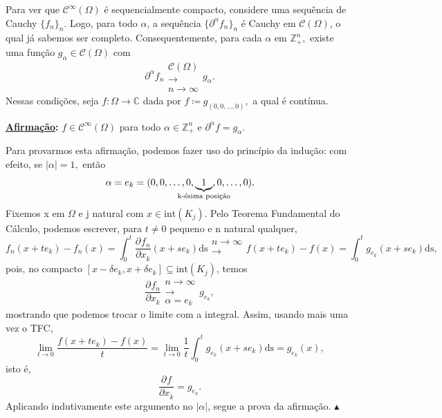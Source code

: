 \documentclass[../distribution_theory_notes.tex]{subfiles}
\begin{document}
\begin{example}
	Para ver que \(\mathcal{C}^{\infty}(\Omega )\) é sequencialmente compacto, considere uma sequência de Cauchy \(\{f_{n}\}_{n}\). Logo, para todo \(\alpha \), a sequência \(\{\partial^{\alpha }f_{n}\}_{n}\) é Cauchy em \(\mathcal{C}(\Omega )\), o qual já sabemos ser completo. Consequentemente, para cada \(\alpha \) em  \(\mathbb{Z}_{+}^{n},\) existe uma função \(g_{\alpha }\in \mathcal{C}(\Omega )\) com
	\[
		\partial^{\alpha }f_{n}\substack{\mathcal{C}(\Omega ) \\ \rightarrow \\ n\to \infty}g_{\alpha }.
	\]
	Nessas condições, seja \(f:\Omega \rightarrow \mathbb{C}\) dada por \(f\coloneqq g_{(0,0,\dotsc ,0)},\) a qual é contínua.

	\textbf{\underline{Afirmação}:} \(f\in \mathcal{C}^{\infty}(\Omega )\) para todo \(\alpha \in \mathbb{Z}_{+}^{n}\) e \(\partial^{\alpha }f = g_{\alpha }\).

	Para provarmos esta afirmação, podemos fazer uso do princípio da indução: com efeito, se \(|\alpha |=1,\) então
	\[
		\alpha  = e_{k}=(0,0,\dotsc ,0,\underbrace{1}_{\mathclap{\text{k-ésima posição}}},0,\dotsc ,0).
	\]
	Fixemos x em \(\Omega \) e j natural com \(x\in \mathrm{int}(K_{j})\). Pelo Teorema Fundamental do Cálculo, podemos escrever, para \(t\neq 0\) pequeno e n natural qualquer,
	\[
		f_{n}(x+te_{k})-f_{n}(x)=\int_{0}^{t}\frac{\partial^{}f_{n}}{\partial x_{k}^{}}(x+se_{k}) \mathrm{ds}\substack{n\to \infty \\ \rightarrow \\ }f(x+te_{k})-f(x)=\int_{0}^{t}g_{e_{k}}(x+se_{k}) \mathrm{ds},
	\]
	pois, no compacto \([x-\delta e_{k}, x+\delta e_{k}]\subseteq \mathrm{int}(K_{j})\), temos
	\[
		\frac{\partial^{}f_{n}}{\partial x_{k}^{}}\substack{n\to \infty \\ \rightarrow \\ \alpha =e_{k} }g_{e_{k}},
	\]
	mostrando que podemos trocar o limite com a integral. Assim, usando mais uma vez o TFC,
	\[
		\lim_{t\to 0} \frac{f(x+te_{k})-f(x)}{t} = \lim_{t\to 0}\frac{1}{t}\int_{0}^{t}g_{e_{k}}(x+se_{k}) \mathrm{ds} = g_{e_{k}}(x),
	\]
	isto é,
	\[
		\frac{\partial^{}f}{\partial x_{k}^{}} = g_{e_{k}}.
	\]
	Aplicando indutivamente este argumento no \(|\alpha |\), segue a prova da afirmação. \(\blacktriangle \)

\end{example}
\end{document}
